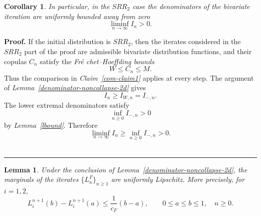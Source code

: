 \documentclass[onecolumn]{article}
\newtheorem{corollary}[theorem]{Corollary}
\newtheorem{lemma}[theorem]{Lemma}
\newenvironment{proof}[1][Proof]{\noindent\textbf{#1.} }{\ \rule{0.5em}{0.5em}}
\begin{document}
\begin{corollary}
\textbf{\label{srr2-denominator-noncollapse}} In particular, in the $SRR_{2}$
case the denominators of the bivariate iteration are uniformly bounded away
from zero 
\begin{equation}
\liminf_{n\rightarrow \infty }I_{n}>0.  \label{345a48}
\end{equation}%
\medskip
\end{corollary}

\begin{proof}
If the initial distribution is $SRR_{2}$, then the iterates considered in
the $SRR_{2}$ part of the proof are admissible bivariate distribution
functions, and their copulas $C_{n}$ satisfy the \textit{Fr\'{e}%
chet--Hoeffding bounds} 
\begin{equation}
W\leq C_{n}\leq M.  \label{345a48a}
\end{equation}%
Thus the comparison in \textit{Claim~\ref{com-claim1}} applies at every
step. The argument of \textit{Lemma~\ref{denominator-noncollapse-2d}} gives 
\begin{equation}
I_{n}\geq I_{W,n}=I_{-,n}.  \label{345a48b}
\end{equation}%
The lower extremal denominators satisfy 
\begin{equation}
\inf_{n\geq 0}I_{-,n}>0  \label{345a48c}
\end{equation}%
by \textit{Lemma~\ref{lbound}}. Therefore 
\begin{equation}
\liminf_{n\rightarrow \infty }I_{n}\geq \inf_{n\geq 0}I_{-,n}>0.
\label{345a48d}
\end{equation}
\end{proof}

\begin{lemma}
\textbf{\label{marginal-lipschitz-from-denominator} }\noindent Under the
conclusion of Lemma~\ref{denominator-noncollapse-2d}, the marginals of the
iterates $\{L_{n}^{F}\}_{n\geq 1}$ are uniformly Lipschitz. More precisely,
for $i=1,2$, 
\begin{equation}
L_{i}^{n+1}(b)-L_{i}^{n+1}(a)\leq \frac{1}{c_{F}}(b-a),\qquad 0\leq a\leq
b\leq 1,\quad n\geq 0.  \label{345a99}
\end{equation}
\end{lemma}
\end{document}
